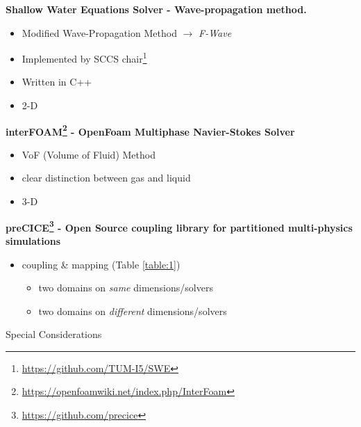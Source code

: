 \begin{frame}
	
\begin{multicols}{2}

\textbf{Shallow Water Equations Solver - Wave-propagation method.}
\vspace{-4mm}
\begin{itemize}
\item Modified Wave-Propagation Method $\rightarrow$ \textit{F-Wave} \cite{levequeArticle}
\item Implemented by SCCS chair\footnote{\url{https://github.com/TUM-I5/SWE}}
\item Written in C++
\item 2-D
\end{itemize}
\textbf{interFOAM\footnote{\url{https://openfoamwiki.net/index.php/InterFoam}} - OpenFoam Multiphase Navier-Stokes Solver}
\vspace{-4mm}
\begin{itemize}
\item VoF (Volume of Fluid) Method
\item clear distinction between gas and liquid
\item 3-D
\end{itemize}

\vfill\columnbreak

\textbf{preCICE\footnote{\url{https://github.com/precice}} - Open Source coupling library for partitioned multi-physics simulations}
\vspace{-4mm}
\begin{itemize}
\item coupling \& mapping (Table \ref{table:1})
\begin{itemize}
\item two domains on \textit{same} dimensions/solvers
\item two domains on \textit{different} dimensions/solvers
\end{itemize}
\end{itemize}
\end{multicols}

\end{frame}



\begin{frame}

\end{frame}


\begin{frame}
\vspace{-0.5cm}
{\large \hspace{3mm} Special Considerations}

\end{frame}

